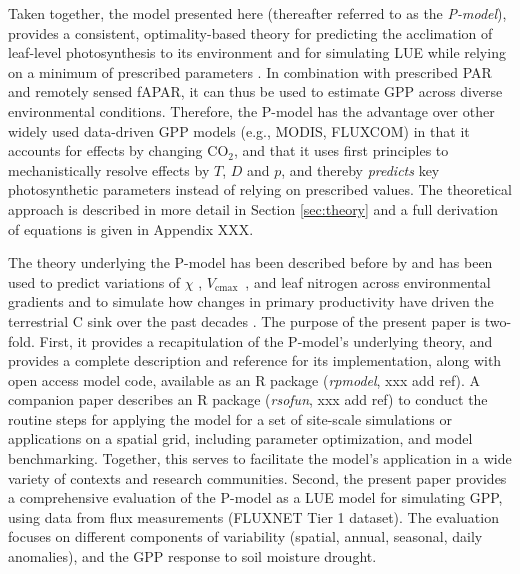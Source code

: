 \documentclass{myreport}
\newcommand{\vcmax}{$V_{\text{cmax}}$}
\begin{document}
Taken together, the model presented here (thereafter referred to as the \textit{P-model}), provides a consistent, optimality-based theory for predicting the acclimation of leaf-level photosynthesis to its environment \citep{prentice14ecollett} and for simulating LUE while relying on a minimum of prescribed parameters \citep{wang17natpl}. In combination with prescribed PAR and remotely sensed fAPAR, it can thus be used to estimate GPP across diverse environmental conditions. Therefore, the P-model has the advantage over other widely used data-driven GPP models (e.g., MODIS, FLUXCOM) in that it accounts for effects by changing CO$_2$, and that it uses first principles to mechanistically resolve effects by $T$, $D$ and $p$, and thereby \textit{predicts} key photosynthetic parameters instead of relying on prescribed values. The theoretical approach is described in more detail in Section \ref{sec:theory} and a full derivation of equations is given in Appendix XXX. 

The theory underlying the P-model has been described before by \cite{prentice14ecollett} and has been used to predict variations of $\chi$ \citep{wang17natpl}, \vcmax\ \citep{smith19ecollett}, and leaf nitrogen \citep{dong16bg} across environmental gradients and to simulate how changes in primary productivity have driven the terrestrial C sink over the past decades \citep{keenan17natcomm}. The purpose of the present paper is two-fold. First, it provides a recapitulation of the P-model's underlying theory, and provides a complete description and reference for its implementation, along with open access model code, available as an R package (\textit{rpmodel}, xxx add ref). A companion paper describes an R package (\textit{rsofun}, xxx add ref) to conduct the routine steps for applying the model for a set of site-scale simulations or applications on a spatial grid, including parameter optimization, and model benchmarking. Together, this serves to facilitate the model's application in a wide variety of contexts and research communities. Second, the present paper provides a comprehensive evaluation of the P-model as a LUE model for simulating GPP, using data from flux measurements (FLUXNET Tier 1 dataset). The evaluation focuses on different components of variability (spatial, annual, seasonal, daily anomalies), and the GPP response to soil moisture drought.
\end{document}
